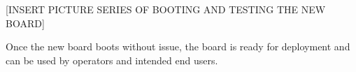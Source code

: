 [INSERT PICTURE SERIES OF BOOTING AND TESTING THE NEW BOARD]

Once the new board boots without issue, the board is ready for deployment and can be used by operators and intended end users.




